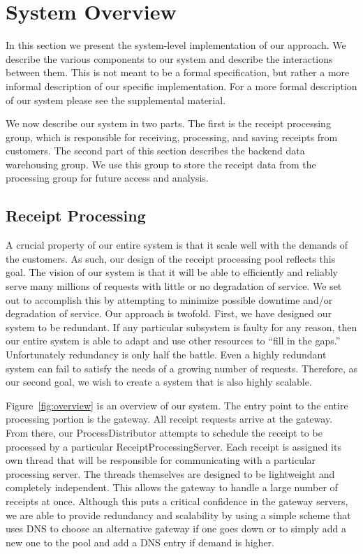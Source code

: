 \section{System Overview}
\label{sec:overview}

In this section we present the system-level implementation of our
approach. We describe the various components to our system and
describe the interactions between them. This is not meant to be a
formal specification, but rather a more informal description of our
specific implementation. For a more formal description of our system
please see the supplemental material.

We now describe our system in two parts. The first is the receipt
processing group, which is responsible for receiving, processing, and
saving receipts from customers. The second part of this section
describes the backend data warehousing group. We use this group to
store the receipt data from the processing group for future access and
analysis.

\subsection{Receipt Processing}
\label{sec:overview.processing}

A crucial property of our entire system is that it scale well with
the demands of the customers. As such, our design of the receipt
processing pool reflects this goal. The vision of our system is that
it will be able to efficiently and reliably serve many millions of
requests with little or no degradation of service. We set out to
accomplish this by attempting to minimize possible downtime and/or
degradation of service. Our approach is twofold. First, we have
designed our system to be redundant. If any particular subsystem is
faulty for any reason, then our entire system is able to adapt and use
other resources to ``fill in the gaps.'' Unfortunately redundancy is
only half the battle. Even a highly redundant system can fail to
satisfy the needs of a growing number of requests. Therefore, as our
second goal, we wish to create a system that is also highly scalable.

Figure~\ref{fig:overview} is an overview of our system. The entry
point to the entire processing portion is the gateway. All receipt
requests arrive at the gateway. From there, our ProcessDistributor
attempts to schedule the receipt to be processed by a particular
ReceiptProcessingServer. Each receipt is assigned its own thread that
will be responsible for communicating with a particular processing
server. The threads themselves are designed to be lightweight and
completely independent. This allows the gateway to handle a large
number of receipts at once. Although this puts a critical confidence
in the gateway servers, we are able to provide redundancy and
scalability by using a simple scheme that uses DNS to choose an
alternative gateway if one goes down or to simply add a new one to the
pool and add a DNS entry if demand is higher.

